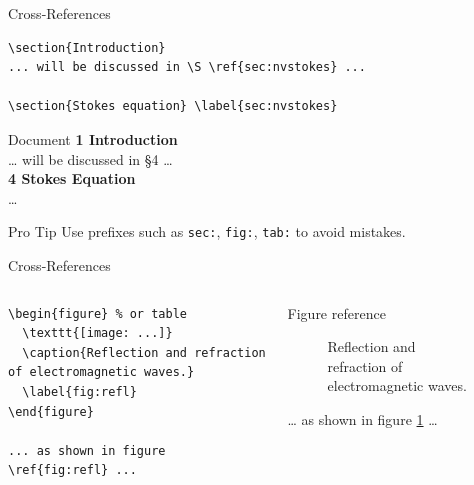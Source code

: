 \documentclass[xetex, onlymath]{beamer}
\begin{document}
\begin{frame}[fragile]{Cross-References}
\begin{lstlisting}
\section{Introduction} 
... will be discussed in \S \ref{sec:nvstokes} ...

\section{Stokes equation} \label{sec:nvstokes}
\end{lstlisting}

\begin{exampleblock}{Document}
\textbf{1\; Introduction} \\[.2em]
\ldots{} will be discussed in \S 4 \ldots{}
\\[1em]

\textbf{4\; Stokes Equation} \\[.2em]
\ldots{}
\end{exampleblock}

\begin{alertblock}{Pro Tip}
Use prefixes such as \texttt{sec:}, \texttt{fig:}, \texttt{tab:} to avoid mistakes.
\end{alertblock}
\end{frame}

\begin{frame}[fragile]{Cross-References}
\begin{columns}
\begin{column}{.5\linewidth}
\begin{lstlisting}
\begin{figure} % or table
  \texttt{[image: ...]}
  \caption{Reflection and refraction of electromagnetic waves.}
  \label{fig:refl}
\end{figure}

... as shown in figure
\ref{fig:refl} ...
\end{lstlisting}
\end{column}
\begin{column}{.5\linewidth}
\begin{exampleblock}{Figure reference}
\begin{figure}[h]
	\newsavebox{}%
	\begin{lrbox}{}%
		
	\end{lrbox}
	\caption{Reflection and refraction of electromagnetic waves.}
	\label{fig:refract}
\end{figure}
\ldots{} as shown in figure \ref{fig:refract} \ldots{}
\end{exampleblock}
\end{column}
\end{columns}
\end{frame}
\end{document}
